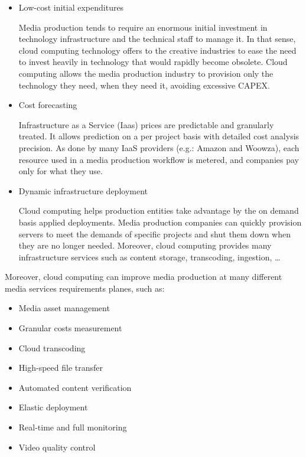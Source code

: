 \begin{itemize}
\item Low-cost initial expenditures \hfill 

Media production tends to require an enormous initial investment in technology infrastructure and the technical staff to manage it. In that sense, cloud computing technology offers to the creative industries to ease the need to invest heavily in technology that would rapidly become obsolete. Cloud computing allows the media production industry to provision only the technology they need, when they need it, avoiding excessive CAPEX.

\item Cost forecasting\hfill 

Infrastructure as a Service (Iaas) prices are predictable and granularly treated. It allows prediction on a per project basis with detailed cost analysis precision. As done by many IaaS providers (e.g.: Amazon and Woowza), each resource used in a media production workflow is metered, and companies pay only for what they use.

\item Dynamic infrastructure deployment \hfill 

Cloud computing helps production entities take advantage by the on demand basis applied deployments. Media production companies can quickly provision servers to meet the demands of specific projects and shut them down when they are no longer needed. Moreover, cloud computing provides many infrastructure services such as content storage, transcoding, ingestion, \ldots
\end{itemize}

Moreover, cloud computing can improve media production at many different media services requirements planes, such as:

\begin{itemize}
\item Media asset management
\item Granular costs measurement
\item Cloud transcoding
\item High-speed file transfer
\item Automated content verification
\item Elastic deployment
\item Real-time and full monitoring
\item Video quality control
\end{itemize}

